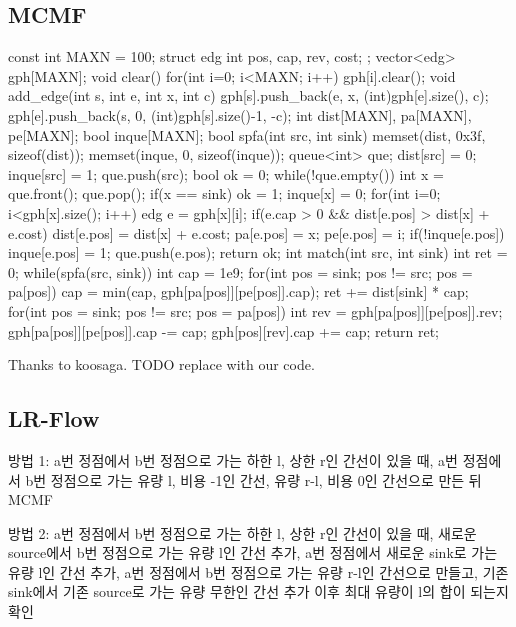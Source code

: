\subsection{MCMF}
\begin{cpp}
const int MAXN = 100;
struct edg{ int pos, cap, rev, cost; };
vector<edg> gph[MAXN];
void clear(){
  for(int i=0; i<MAXN; i++) gph[i].clear();
}
void add_edge(int s, int e, int x, int c){
  gph[s].push_back({e, x, (int)gph[e].size(), c});
  gph[e].push_back({s, 0, (int)gph[s].size()-1, -c});
}
int dist[MAXN], pa[MAXN], pe[MAXN];
bool inque[MAXN];
bool spfa(int src, int sink){
  memset(dist, 0x3f, sizeof(dist));
  memset(inque, 0, sizeof(inque));
  queue<int> que;
  dist[src] = 0;
  inque[src] = 1;
  que.push(src);
  bool ok = 0;
  while(!que.empty()){
    int x = que.front();
    que.pop();
    if(x == sink) ok = 1;
    inque[x] = 0;
    for(int i=0; i<gph[x].size(); i++){
      edg e = gph[x][i];
      if(e.cap > 0 && dist[e.pos] > dist[x] + e.cost){
        dist[e.pos] = dist[x] + e.cost;
        pa[e.pos] = x;
        pe[e.pos] = i;
        if(!inque[e.pos]){
          inque[e.pos] = 1;
          que.push(e.pos);
        }
      }
    }
  }
  return ok;
}
int match(int src, int sink){
  int ret = 0;
  while(spfa(src, sink)){
    int cap = 1e9;
    for(int pos = sink; pos != src; pos = pa[pos]){
      cap = min(cap, gph[pa[pos]][pe[pos]].cap);
    }
    ret += dist[sink] * cap;
    for(int pos = sink; pos != src; pos = pa[pos]){
      int rev = gph[pa[pos]][pe[pos]].rev;
      gph[pa[pos]][pe[pos]].cap -= cap;
      gph[pos][rev].cap += cap;
    }
  }
  return ret;
}
\end{cpp}
Thanks to koosaga. TODO replace with our code.

\subsection{LR-Flow}
방법 1: a번 정점에서 b번 정점으로 가는 하한 l, 상한 r인 간선이 있을 때, a번 정점에서 b번 정점으로 가는 유량 l, 비용 -1인 간선, 유량 r-l, 비용 0인 간선으로 만든 뒤 MCMF

방법 2: a번 정점에서 b번 정점으로 가는 하한 l, 상한 r인 간선이 있을 때, 새로운 source에서 b번 정점으로 가는 유량 l인 간선 추가, a번 정점에서 새로운 sink로 가는 유량 l인 간선 추가, a번 정점에서 b번 정점으로 가는 유량 r-l인 간선으로 만들고, 기존 sink에서 기존 source로 가는 유량 무한인 간선 추가 이후 최대 유량이 l의 합이 되는지 확인

